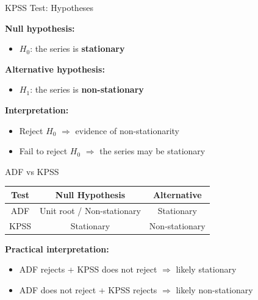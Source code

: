 \documentclass[aspectratio=169]{beamer}
\begin{document}
\begin{frame}{KPSS Test: Hypotheses}

\textbf{Null hypothesis:}
\begin{itemize}
    \item $H_0$: the series is \textbf{stationary}
\end{itemize}

\vspace{0.3cm}

\textbf{Alternative hypothesis:}
\begin{itemize}
    \item $H_1$: the series is \textbf{non-stationary}
\end{itemize}

\vspace{0.4cm}

\textbf{Interpretation:}
\begin{itemize}
    \item Reject $H_0$ $\Rightarrow$ evidence of non-stationarity
    \item Fail to reject $H_0$ $\Rightarrow$ the series may be stationary
\end{itemize}

\end{frame}

\begin{frame}{ADF vs KPSS}

\begin{center}
\begin{tabular}{|c|c|c|}
\hline
\textbf{Test} & \textbf{Null Hypothesis} & \textbf{Alternative} \\
\hline
ADF & Unit root / Non-stationary & Stationary \\
\hline
KPSS & Stationary & Non-stationary \\
\hline
\end{tabular}
\end{center}

\vspace{0.4cm}

\textbf{Practical interpretation:}
\begin{itemize}
    \item ADF rejects + KPSS does not reject $\Rightarrow$ likely stationary
    \item ADF does not reject + KPSS rejects $\Rightarrow$ likely non-stationary
\end{itemize}

\end{frame}
\end{document}
